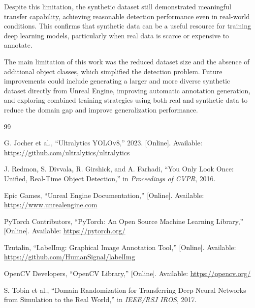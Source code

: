 \documentclass[conference,a4paper]{IEEEtran}
\begin{document}
Despite this limitation, the synthetic dataset still demonstrated meaningful transfer capability, achieving reasonable detection performance even in real-world conditions. This confirms that synthetic data can be a useful resource for training deep learning models, particularly when real data is scarce or expensive to annotate.

The main limitation of this work was the reduced dataset size and the absence of additional object classes, which simplified the detection problem. Future improvements could include generating a larger and more diverse synthetic dataset directly from Unreal Engine, improving automatic annotation generation, and exploring combined training strategies using both real and synthetic data to reduce the domain gap and improve generalization performance.


\begin{thebibliography}{99}

G. Jocher et al.,
``Ultralytics YOLOv8,''
2023. [Online]. Available: \url{https://github.com/ultralytics/ultralytics}

J. Redmon, S. Divvala, R. Girshick, and A. Farhadi,
``You Only Look Once: Unified, Real-Time Object Detection,''
in \textit{Proceedings of CVPR}, 2016.

Epic Games,
``Unreal Engine Documentation,''
[Online]. Available: \url{https://www.unrealengine.com}

PyTorch Contributors,
``PyTorch: An Open Source Machine Learning Library,''
[Online]. Available: \url{https://pytorch.org/}

Tzutalin,
``LabelImg: Graphical Image Annotation Tool,''
[Online]. Available: \url{https://github.com/HumanSignal/labelImg}

OpenCV Developers,
``OpenCV Library,''
[Online]. Available: \url{https://opencv.org/}

S. Tobin et al.,
``Domain Randomization for Transferring Deep Neural Networks from Simulation to the Real World,''
in \textit{IEEE/RSJ IROS}, 2017.

\end{thebibliography}
\end{document}
